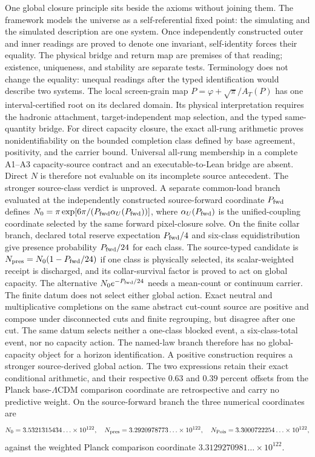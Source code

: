 \documentclass[10pt]{article}
\begin{document}
One global closure principle sits beside the axioms without joining them. The
framework models the universe as a self-referential fixed point: the
simulating and the simulated description are one system. Once independently
constructed outer and inner readings are proved to denote one invariant,
self-identity forces their equality. The physical bridge and return map are
premises of that reading; existence, uniqueness, and stability are
separate tests. Terminology does not change the equality: unequal readings
after the typed identification would describe two systems. The local screen-grain map
\(P=\varphi+\sqrt{\pi}/A_T(P)\) has one interval-certified root on its
declared domain. Its physical interpretation requires the hadronic attachment,
target-independent map selection, and the typed same-quantity bridge. For direct
capacity closure, the exact all-rung arithmetic proves nonidentifiability on
the bounded completion class defined by base agreement, positivity, and the
carrier bound. Universal all-rung membership in a complete A1--A3
capacity-source contract and an executable-to-Lean bridge are absent. Direct
\(N\) is therefore not evaluable on its incomplete source antecedent. The
stronger source-class verdict is unproved. A separate common-load
branch evaluated at the independently constructed source-forward coordinate
\(P_{\rm fwd}\) defines
\(N_0=\pi\exp[6\pi/(P_{\rm fwd}\alpha_U(P_{\rm fwd}))]\), where
\(\alpha_U(P_{\rm fwd})\) is the unified-coupling coordinate selected by the
same forward pixel-closure solve. On the finite collar branch,
declared total reserve expectation \(P_{\rm fwd}/4\) and six-class
equidistribution give presence probability \(P_{\rm fwd}/24\) for each class.
The source-typed candidate is
\(N_{\rm pres}=N_0(1-P_{\rm fwd}/24)\) if one class is physically selected, its
scalar-weighted receipt is discharged, and its collar-survival factor is
proved to act on global capacity. The alternative
\(N_0e^{-P_{\rm fwd}/24}\) needs a
mean-count or continuum carrier. The finite datum does not select either
global action. Exact neutral and multiplicative completions on the same
abstract cut-count source are positive and compose under disconnected cuts
and finite regrouping, but disagree after one cut. The same datum selects
neither a one-class blocked event, a six-class-total event, nor no capacity
action. The named-law branch therefore has no global-capacity object for a
horizon identification. A positive construction requires a stronger
source-derived global action. The two expressions retain their exact conditional arithmetic,
and their respective
\(0.63\) and \(0.39\) percent offsets from the Planck
base-\(\Lambda\)CDM comparison coordinate are retrospective and carry no
predictive weight. On the source-forward branch the three numerical
coordinates are
\[
N_0=3.5321315434\ldots\times10^{122},\quad
N_{\rm pres}=3.2920978773\ldots\times10^{122},\quad
N_{\rm Pois}=3.3000722254\ldots\times10^{122},
\]
against the weighted Planck comparison coordinate
\(3.3129270981\ldots\times10^{122}\).
\end{document}
